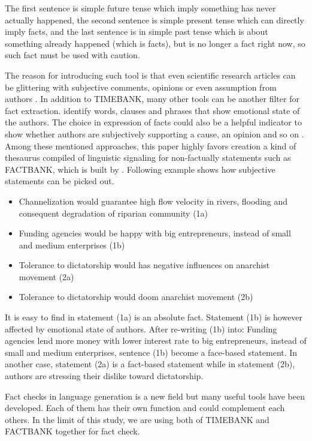 The first sentence is simple future tense which imply something has never actually happened, the second sentence is simple present tense which can directly imply facts, and the last sentence is in simple past tense which is about something already happened (which is facts), but is no longer a fact right now, so such fact must be used with caution. 

The reason for introducing such tool is that even scientific research articles can be glittering with subjective comments, opinions or even assumption from authors \cite{schultze2000confessional}. In addition to TIMEBANK, many other tools can be another filter for fact extraction. 
\cite{Dave2003mining} identify words, clauses and phrases that show emotional state of the authors. 
The choice in expression of facts could also be a helpful indicator to show whether authors are subjectively supporting a cause, an opinion and so on \cite{Wiebe2005}. 
Among these mentioned approaches, this paper highly favors creation a kind of thesaurus compiled of linguistic signaling for non-factually statements such as FACTBANK, which is built by \cite{Sauri2009}. 
Following example shows how subjective statements can be picked out.

\begin{itemize}
	\item Channelization would guarantee high flow velocity in rivers, flooding and consequent degradation of riparian community (1a)
	\item Funding agencies would be happy with big entrepreneurs, instead of small and medium enterprises (1b)
	\item Tolerance to dictatorship would has negative influences on anarchist movement (2a)
	\item Tolerance to dictatorship would doom anarchist movement (2b)
\end{itemize}

It is easy to find in statement (1a) is an absolute fact. 
Statement (1b) is however affected by emotional state of authors. 
After re-writing (1b) into: Funding agencies lend more money with lower interest rate to big entrepreneurs, instead of small and medium enterprises, sentence (1b) become a face-based statement. 
In another case, statement (2a) is a fact-based statement while in statement (2b), authors are stressing their dislike toward dictatorship.

Fact checks in language generation is a new field but many useful tools have been developed. 
Each of them has their own function and could complement each others. 
In the limit of this study, we are using both of TIMEBANK and FACTBANK together for fact check.



